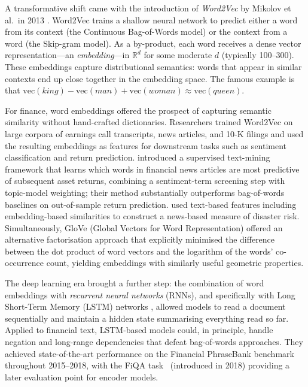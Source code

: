 \begin{context}
A transformative shift came with the introduction of \emph{Word2Vec} by Mikolov et al.\
in 2013 \cite{mikolov2013efficient}. %
Word2Vec trains a shallow neural network to predict either a word from its context
(the Continuous Bag-of-Words model) or the context from a word (the Skip-gram model).
As a by-product, each word receives a dense vector representation---an
\emph{embedding}---in $\mathbb{R}^d$ for some moderate $d$ (typically 100--300).
These embeddings capture distributional semantics: words that appear in similar contexts
end up close together in the embedding space.  The famous example is that
$\text{vec}(\textit{king}) - \text{vec}(\textit{man}) + \text{vec}(\textit{woman})
\approx \text{vec}(\textit{queen})$.

For finance, word embeddings offered the prospect of capturing semantic similarity
without hand-crafted dictionaries.  Researchers trained Word2Vec on large corpora of
earnings call transcripts, news articles, and 10-K filings and used the resulting
embeddings as features for downstream tasks such as sentiment classification and return
prediction.  \citet{ke2019predicting} introduced a supervised
text-mining framework that learns which words in financial news articles are most
predictive of subsequent asset returns, combining a sentiment-term screening step with
topic-model weighting; their method substantially outperforms bag-of-words baselines
on out-of-sample return prediction.  \citet{manela2017news} %
used text-based features including embedding-based similarities to construct a news-based
measure of disaster risk.  Simultaneously, GloVe (Global Vectors for Word
Representation) \cite{pennington2014glove} %
offered an alternative factorisation approach that explicitly minimised the
difference between the dot product of word vectors and the logarithm of the words'
co-occurrence count, yielding embeddings with similarly useful geometric properties.

The deep learning era brought a further step: the combination of word embeddings with \emph{recurrent neural networks} (RNNs), and
specifically with Long Short-Term Memory (LSTM) networks
\cite{hochreiter1997long}, %
allowed models to read a document sequentially and maintain a hidden state summarising
everything read so far.  Applied to financial text, LSTM-based models could, in
principle, handle negation and long-range dependencies that defeat bag-of-words
approaches.  They achieved state-of-the-art performance on the Financial PhraseBank benchmark~\citep{malo2014phrasebank} throughout 2015--2018, with the FiQA task~\citep{maia2018fiqa} (introduced in 2018) providing a later evaluation point for encoder models.


\end{context}
